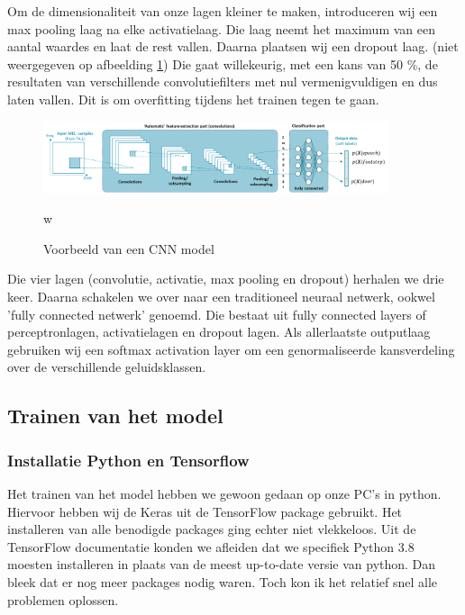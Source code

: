 Om de dimensionaliteit van onze lagen kleiner te maken, introduceren wij een max pooling laag na elke activatielaag. Die laag neemt het maximum van een aantal waardes en laat de rest vallen. Daarna plaatsen wij een dropout laag. (niet weergegeven op afbeelding \ref{fig:cnn-model}) Die gaat willekeurig, met een kans van 50 \%, de resultaten van verschillende convolutiefilters met nul vermenigvuldigen en dus laten vallen. Dit is om overfitting tijdens het trainen tegen te gaan.

\begin{figure}[ht]
	\centering
	\includegraphics[width=0.9\textwidth]{figuren/cnn.png}
	\caption{Voorbeeld van een CNN model}w
	\cite{slides:cnn}
	\label{fig:cnn-model}
\end{figure}

Die vier lagen (convolutie, activatie, max pooling en dropout) herhalen we drie keer. Daarna schakelen we over naar een traditioneel neuraal netwerk, ookwel 'fully connected netwerk' genoemd. Die bestaat uit fully connected layers of perceptronlagen, activatielagen en dropout lagen. Als allerlaatste outputlaag gebruiken wij een softmax activation layer om een genormaliseerde kansverdeling over de verschillende geluidsklassen. \cite{enwiki:softmax}


\subsection{Trainen van het model}
\subsubsection{Installatie Python en Tensorflow}
Het trainen van het model hebben we gewoon gedaan op onze PC's in python. Hiervoor hebben wij de Keras uit de TensorFlow package gebruikt. Het installeren van alle benodigde packages ging echter niet vlekkeloos. Uit de TensorFlow documentatie konden we afleiden dat we specifiek Python 3.8 moesten installeren in plaats van de meest up-to-date versie van python. Dan bleek dat er nog meer packages nodig waren. Toch kon ik het relatief snel alle problemen oplossen.

